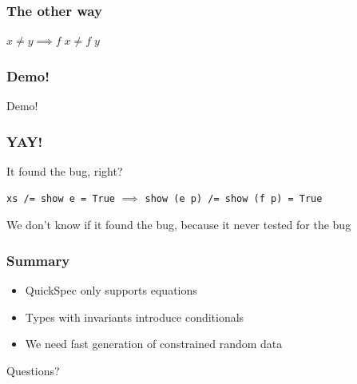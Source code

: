 \documentclass{beamer}
\begin{document}
\begin{frame}
    \frametitle{The other way}
    \centerline{$x \neq y \implies f\;x\neq f\;y$} 
\end{frame}

\begin{frame}
    \frametitle{Demo!}
        \Huge{\centerline{Demo!}}
\end{frame}

\begin{frame}
    \frametitle{YAY!}
    \centerline{It found the bug, right?}
    \pause
    \centerline{}
    \centerline{\texttt{xs /= show e = True} $\implies$ \texttt{show (e p) /= show (f p) = True}}
    \centerline{}
    \centerline{We don't know if it found the bug, because it never tested for the bug}
\end{frame}

\begin{frame}
    \frametitle{Summary}
    \begin{itemize}
        \item QuickSpec only supports equations
        \item Types with invariants introduce conditionals
        \item We need fast generation of constrained random data
    \end{itemize}
\end{frame}

\begin{frame}
    \Huge{\centerline{Questions?}}
\end{frame}
\end{document}
